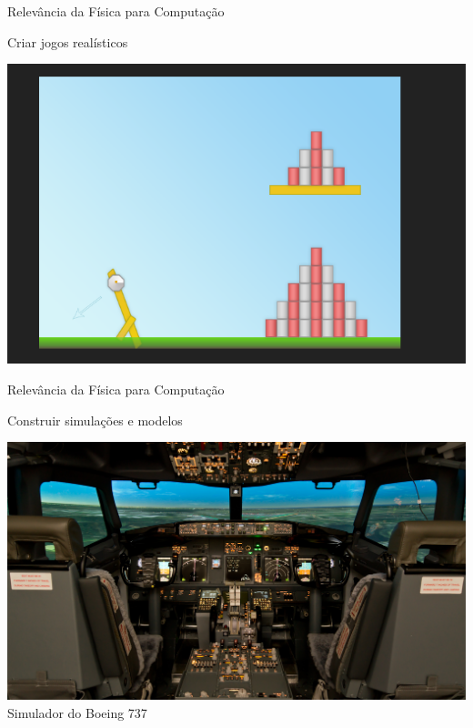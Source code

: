 \documentclass[xcolor=dvipsnames,table]{beamer}
\begin{document}
	\begin{frame}{Relevância da Física para Computação}
		\begin{block}{Criar jogos realísticos}
			\begin{center}
	    		\includegraphics[height=.7\textheight]{images/slingshot.png}
	  		\end{center}
		\end{block}
	\end{frame}
	
	\begin{frame}{Relevância da Física para Computação}
		\begin{block}{Construir simulações e modelos}
			\begin{center}
	    		\includegraphics[height=.7\textheight]{images/boeing737.jpg}
	    		\\Simulador do Boeing 737
	  		\end{center}
		\end{block}
	\end{frame}
	
\end{document}
